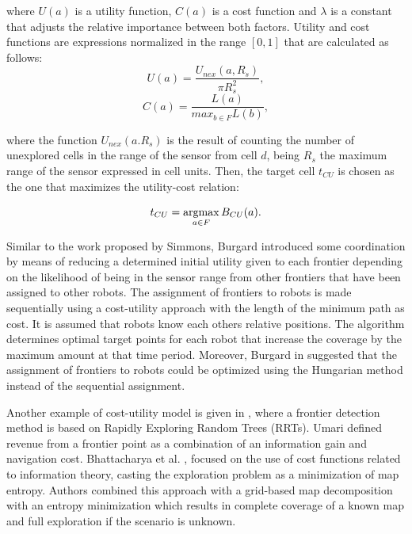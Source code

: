 where $U(a)$ is a utility function, $C(a)$ is a cost function and $\lambda$ is a constant that adjusts the relative importance between both factors. Utility and cost functions are expressions normalized in the range $\left[0, 1\right]$ that are calculated as follows:
\begin{equation}
U(a) = \frac{U_{nex}(a, R_{s})}{\pi R_{s}^{2}},
\end{equation}
\begin{equation}
C(a) = \frac{L(a)}{max_{b \in F}L(b)},
\end{equation}

where the function $U_{nex}(a. R_{s})$ is the result of counting the number of unexplored cells in the range of the sensor from cell $d$, being $R_{s}$ the maximum range of the sensor expressed in cell units.
Then, the target cell $t_{CU}$ is chosen as the one that maximizes the utility-cost relation:

\begin{equation}
t_{CU} = \operatorname*{argmax}_{a \in F} B_{CU}(a).
\end{equation}

Similar to the work proposed by Simmons, Burgard \cite{Burgard2000} introduced some coordination by means of reducing a determined initial utility given to each frontier depending on the likelihood of being in the sensor range from other frontiers that have been assigned to other robots. The assignment of frontiers to robots is made sequentially using a cost-utility approach with the length of the minimum path as cost. It is assumed that robots know each others relative positions. The algorithm determines optimal target points for each robot that increase the coverage by the maximum amount at that time period. Moreover, Burgard in \cite{Burgard2005} suggested that the assignment of frontiers to robots could be optimized using the Hungarian method \cite{Kuhn1955} instead of the sequential assignment.

Another example of cost-utility model is given in \cite{Umari2017}, where a frontier detection method is based on Rapidly Exploring Random Trees (RRTs). Umari defined revenue from a frontier point as a combination of an information gain and navigation cost. 
Bhattacharya et al. \cite{Bhattacharya2013}, \cite{BhattacharyaGhrist2013} focused on the use of cost functions related to information theory, casting the exploration problem as a minimization of map entropy. Authors combined this approach with a grid-based map decomposition with an entropy minimization which results in complete coverage of a known map and full exploration if the scenario is unknown. 

